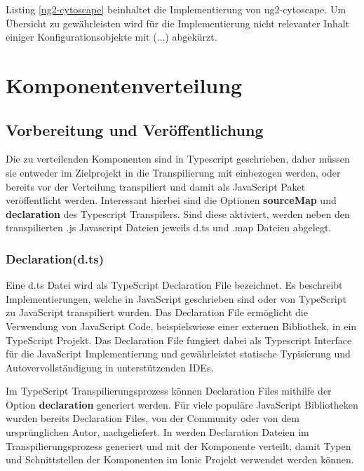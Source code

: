 

Listing \ref{ng2-cytoscape} beinhaltet die Implementierung von ng2-cytoscape.
Um Übersicht zu gewährleisten wird für die Implementierung nicht relevanter Inhalt einiger Konfigurationsobjekte mit (...) abgekürzt.


\newpage
\section{Komponentenverteilung}


\subsection{Vorbereitung und Veröffentlichung}

Die zu verteilenden Komponenten sind in Typescript geschrieben,
daher müssen sie entweder im Zielprojekt in die Transpilierung mit einbezogen werden,
oder bereits vor der Verteilung transpiliert und damit als JavaScript Paket veröffentlicht werden.
Interessant hierbei sind die Optionen \textbf{sourceMap} und \textbf{declaration} des Typescript Transpilers.
Sind diese aktiviert, werden neben den transpilierten .js Javascript Dateien jeweils d.ts und .map Dateien abgelegt.

\subsubsection{Declaration(d.ts)}

Eine d.ts Datei wird als TypeScript Declaration File bezeichnet.
Es beschreibt Implementierungen, welche in JavaScript geschrieben sind oder von TypeScript zu JavaScript transpiliert wurden.
Das Declaration File ermöglicht die Verwendung von JavaScript Code, beispielswiese einer externen Bibliothek,
in ein TypeScript Projekt. Das Declaration File fungiert dabei als Typescript Interface
für die JavaScript Implementierung und gewährleistet statische Typisierung
und Autovervollständigung in unterstützenden IDEs.

Im TypeScript Transpilierungsprozess können Declaration Files mithilfe der Option \textbf{declaration} generiert werden.
Für viele populäre JavaScript Bibliotheken wurden bereits Declaration Files, von der Community oder von dem ursprünglichen Autor, nachgeliefert.
In \projectname{} werden Declaration Dateien im Transpilierungsprozess generiert und mit der Komponente verteilt,
damit Typen und Schnittstellen der Komponenten im Ionic Projekt verwendet werden können.
\cite[471]{EssentialTS}

